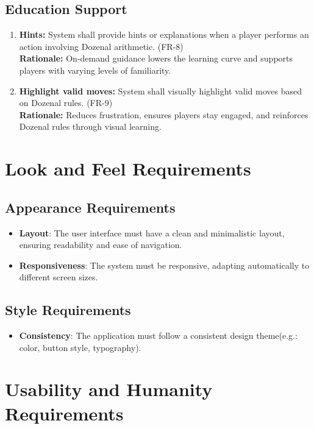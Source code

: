 \documentclass[12pt]{article}
\begin{document}
\subsection{Education Support}

\begin{enumerate}
    \item \textbf{Hints:} System shall provide hints or explanations when a player performs an action involving Dozenal arithmetic. (FR-8) \\
    \textbf{Rationale:} On-demand guidance lowers the learning curve and supports players with varying levels of familiarity.

    \item \textbf{Highlight valid moves:} System shall visually highlight valid moves based on Dozenal rules. (FR-9) \\
    \textbf{Rationale:} Reduces frustration, ensures players stay engaged, and reinforces Dozenal rules through visual learning.
\end{enumerate}

\section{Look and Feel Requirements}
\subsection{Appearance Requirements}
	\begin{itemize}
		\item \textbf{Layout}: The user interface must have a clean and minimalistic layout, ensuring readability and ease of navigation.
		\item \textbf{Responsiveness}: The system must be responsive, adapting automatically to different screen sizes.
	\end{itemize}
\subsection{Style Requirements}
	\begin{itemize}
		\item \textbf{Consistency}: The application must follow a consistent design theme(e.g.: color, button style, typography).
	\end{itemize}

\section{Usability and Humanity Requirements}
\end{document}
